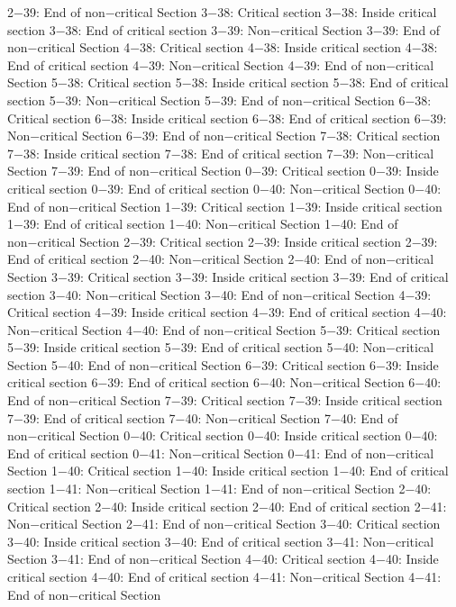 2−39: End of non−critical Section
3−38: Critical section
3−38: Inside critical section
3−38: End of critical section
3−39: Non−critical Section
3−39: End of non−critical Section
4−38: Critical section
4−38: Inside critical section
4−38: End of critical section
4−39: Non−critical Section
4−39: End of non−critical Section
5−38: Critical section
5−38: Inside critical section
5−38: End of critical section
5−39: Non−critical Section
5−39: End of non−critical Section
6−38: Critical section
6−38: Inside critical section
6−38: End of critical section
6−39: Non−critical Section
6−39: End of non−critical Section
7−38: Critical section
7−38: Inside critical section
7−38: End of critical section
7−39: Non−critical Section
7−39: End of non−critical Section
0−39: Critical section
0−39: Inside critical section
0−39: End of critical section
0−40: Non−critical Section
0−40: End of non−critical Section
1−39: Critical section
1−39: Inside critical section
1−39: End of critical section
1−40: Non−critical Section
1−40: End of non−critical Section
2−39: Critical section
2−39: Inside critical section
2−39: End of critical section
2−40: Non−critical Section
2−40: End of non−critical Section
3−39: Critical section
3−39: Inside critical section
3−39: End of critical section
3−40: Non−critical Section
3−40: End of non−critical Section
4−39: Critical section
4−39: Inside critical section
4−39: End of critical section
4−40: Non−critical Section
4−40: End of non−critical Section
5−39: Critical section
5−39: Inside critical section
5−39: End of critical section
5−40: Non−critical Section
5−40: End of non−critical Section
6−39: Critical section
6−39: Inside critical section
6−39: End of critical section
6−40: Non−critical Section
6−40: End of non−critical Section
7−39: Critical section
7−39: Inside critical section
7−39: End of critical section
7−40: Non−critical Section
7−40: End of non−critical Section
0−40: Critical section
0−40: Inside critical section
0−40: End of critical section
0−41: Non−critical Section
0−41: End of non−critical Section
1−40: Critical section
1−40: Inside critical section
1−40: End of critical section
1−41: Non−critical Section
1−41: End of non−critical Section
2−40: Critical section
2−40: Inside critical section
2−40: End of critical section
2−41: Non−critical Section
2−41: End of non−critical Section
3−40: Critical section
3−40: Inside critical section
3−40: End of critical section
3−41: Non−critical Section
3−41: End of non−critical Section
4−40: Critical section
4−40: Inside critical section
4−40: End of critical section
4−41: Non−critical Section
4−41: End of non−critical Section
